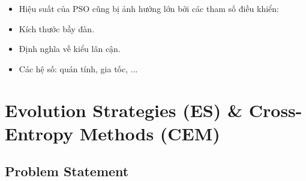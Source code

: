 \documentclass{book}
\begin{document}
\begin{itemize}
    \item Hiệu suất của PSO cũng bị ảnh hưởng lớn bởi các tham số điều khiển:
    \item Kích thước bầy đàn.
    \item Định nghĩa về kiểu lân cận.
    \item Các hệ số: quán tính, gia tốc, ...
\end{itemize}
\chapter{Evolution Strategies (ES) \& Cross-Entropy Methods (CEM)}
\section{Problem Statement}
\end{document}
